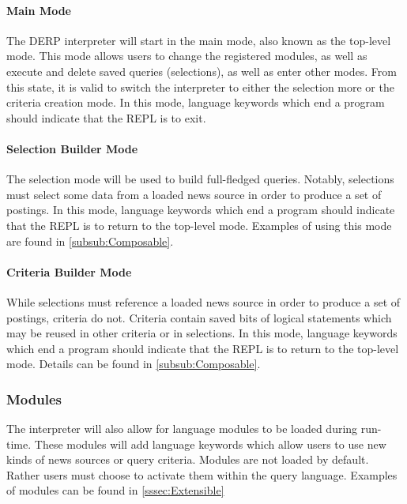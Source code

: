 \paragraph{Main Mode}

The DERP interpreter will start in the main mode, also known as the top-level mode. This mode allows users to change the registered modules, as well as execute and delete saved queries (selections), as well as enter other modes. From this state, it is valid to switch the interpreter to either the selection more or the criteria creation mode. In this mode, language keywords which end a program should indicate that the REPL is to exit.

\paragraph{Selection Builder Mode}

The selection mode will be used to build full-fledged queries. Notably, selections must select some data from a loaded news source in order to produce a set of postings. In this mode, language keywords which end a program should indicate that the REPL is to return to the top-level mode. Examples of using this mode are found in \autoref{subsub:Composable}. 

\paragraph{Criteria Builder Mode}

While selections must reference a loaded news source in order to produce a set of postings, criteria do not. Criteria contain saved bits of logical statements which may be reused in other criteria or in selections. In this mode, language keywords which end a program should indicate that the REPL is to return to the top-level mode. Details can be found in \autoref{subsub:Composable}.


\subsubsection{Modules}

The interpreter will also allow for language modules to be loaded during run-time. These modules will add language keywords which allow users to use new kinds of news sources or query criteria. Modules are not loaded by default. Rather users must choose to activate them within the query language. Examples of modules can be found in \autoref{sssec:Extensible}

